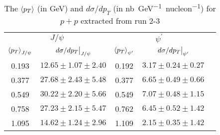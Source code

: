 \documentclass[../main.tex]{subfiles}
\begin{document}
\begin{table}[h!]
	\centering
	\caption{The $\expval{p_T}$ (in \unit{\GeV}) and  $d\sigma/dp_T$ (in \unit{\nano\barn\GeV^{-1} nucleon^{-1}}) for $p+p$ extracted from run 2-3}
	\begin{tabular}{cc|ccc}
		\hline
		\multicolumn{2}{c|}{$J/\psi$} & \multicolumn{2}{c}{$\psi^{\prime}$} &                                                                      \\ \cline{1-4}
		$\expval{p_T}_{J/\psi}$       & $\eval{d\sigma/dp_T}_{J/\psi}$      & $\expval{p_T}_{\psi^\prime}$ & $\eval{d\sigma/dp_T}_{\psi^\prime}$ & \\ \cline{1-4}
		\multicolumn{1}{c|}{0.193}    & $12.65\pm1.07\pm2.40$               & \multicolumn{1}{c|}{0.192}   & $3.17\pm0.24\pm0.27$                & \\
		\multicolumn{1}{c|}{0.377}    & $27.68\pm2.43\pm5.48$               & \multicolumn{1}{c|}{0.377}   & $6.65\pm0.49\pm0.66$                & \\
		\multicolumn{1}{c|}{0.549}    & $30.22\pm2.20\pm5.66$               & \multicolumn{1}{c|}{0.549}   & $7.07\pm0.48\pm1.15$                & \\
		\multicolumn{1}{c|}{0.758}    & $27.23\pm2.15\pm5.47$               & \multicolumn{1}{c|}{0.762}   & $6.45\pm0.52\pm1.42$                & \\
		\multicolumn{1}{c|}{1.095}    & $14.62\pm1.24\pm2.96$               & \multicolumn{1}{c|}{1.109}   & $2.15\pm0.35\pm1.42$                & \\ \cline{1-4}
	\end{tabular}
\end{table}
\end{document}

